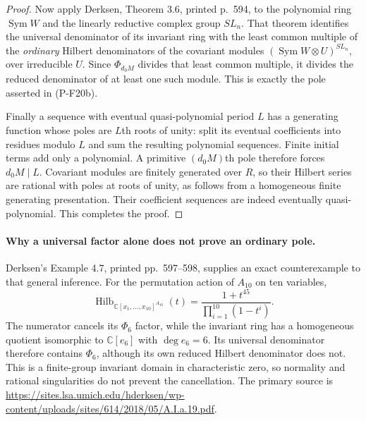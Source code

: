\documentclass[11pt,a4paper]{article}
\begin{document}
\begin{proof}
Now apply Derksen, Theorem 3.6, printed p.~594, to the polynomial
ring $\operatorname{Sym}W$ and the linearly reductive complex group
$SL_n$. That theorem identifies the universal denominator of
its invariant ring with the least common multiple of the
\emph{ordinary} Hilbert denominators of the covariant modules
$(\operatorname{Sym}W\otimes U)^{SL_n}$, over irreducible $U$.
Since $\Phi_{d_0M}$ divides that least common multiple, it divides
the reduced denominator of at least one such module. This is
exactly the pole asserted in (P-F20b).

Finally a sequence with eventual quasi-polynomial period $L$
has a generating function whose poles are $L$th roots of unity:
split its eventual coefficients into residues modulo $L$ and
sum the resulting polynomial sequences. Finite initial terms
add only a polynomial. A primitive $(d_0M)$th pole therefore
forces $d_0M\mid L$. Covariant modules are finitely generated
over $R$, so their Hilbert series are rational with poles at
roots of unity, as follows from a homogeneous finite generating
presentation. Their coefficient sequences are indeed eventually
quasi-polynomial. This completes the proof.
\end{proof}

\paragraph{Why a universal factor alone does not prove an ordinary pole.}
Derksen's Example 4.7, printed pp.~597--598, supplies an exact
counterexample to that general inference. For the permutation action
of $A_{10}$ on ten variables,
\[
 \operatorname{Hilb}_{\mathbb C[x_1,\ldots,x_{10}]^{A_{10}}}(t)
   =\frac{1+t^{45}}{\prod_{i=1}^{10}(1-t^i)}.
\]
The numerator cancels its $\Phi_6$ factor, while the invariant
ring has a homogeneous quotient isomorphic to $\mathbb C[e_6]$
with $\deg e_6=6$. Its universal denominator therefore contains
$\Phi_6$, although its own reduced Hilbert denominator does not.
This is a finite-group invariant domain in characteristic zero,
so normality and rational singularities do not prevent the
cancellation. The primary source is
\url{https://sites.lsa.umich.edu/hderksen/wp-content/uploads/sites/614/2018/05/A.I.a.19.pdf}.
\end{document}
